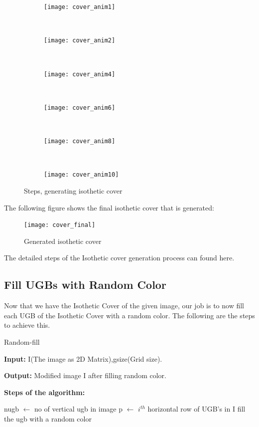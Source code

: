 \documentclass[12pt]{article}
\begin{document}
\begin{figure}[H]
	\centering
	\begin{subfigure}[b]{0.3\textwidth}
		\centering
		\texttt{[image: cover\_anim1]}
	\end{subfigure}
	~
	\begin{subfigure}[b]{0.3\textwidth}
		\centering
		\texttt{[image: cover\_anim2]}
	\end{subfigure}
	~
	\begin{subfigure}[b]{0.3\textwidth}
		\centering
		\texttt{[image: cover\_anim4]}
	\end{subfigure}
	~
	\begin{subfigure}[b]{0.3\textwidth}
		\centering
		\texttt{[image: cover\_anim6]}
	\end{subfigure}
	~
	\begin{subfigure}[b]{0.3\textwidth}
		\centering
		\texttt{[image: cover\_anim8]}
	\end{subfigure}
	~
	\begin{subfigure}[b]{0.3\textwidth}
		\centering
		\texttt{[image: cover\_anim10]}
	\end{subfigure}
	\caption{Steps, generating isothetic cover}
	\label{fig:animals}
\end{figure}
\vspace{10cm}
The following figure shows the final isothetic cover that is generated:

\begin{figure}[H]
	\centering
	\texttt{[image: cover\_final]}
	\caption{Generated isothetic cover}
	\label{fig:fig_cover_final}
\end{figure}

The detailed steps of the Isothetic cover generation process can found here\cite{ref1}.



 
\subsection{Fill UGBs with Random Color}
Now that we have the Isothetic Cover of the given image, our job is to now fill each UGB of the Isothetic Cover with a random color. The following are the steps to achieve this.

\begin{algorithm}[htp]
\caption{Random-fill}
\textbf{Input:} I(The image as 2D Matrix),gsize(Grid size).\par
\textbf{Output:} Modified image I after filling random color.\par
\textbf{Steps of the algorithm:}
\begin{algorithmic}[1]
\State nugb $\longleftarrow$ no of vertical ugb in image
    \State p $\longleftarrow$ $i^{th}$ horizontal row of UGB's in I
    			\State fill the ugb with a random color
    		\EndIf
	\EndFor
\EndFor
\end{algorithmic}
\label{Algorithm:2}
\end{algorithm}
\end{document}
